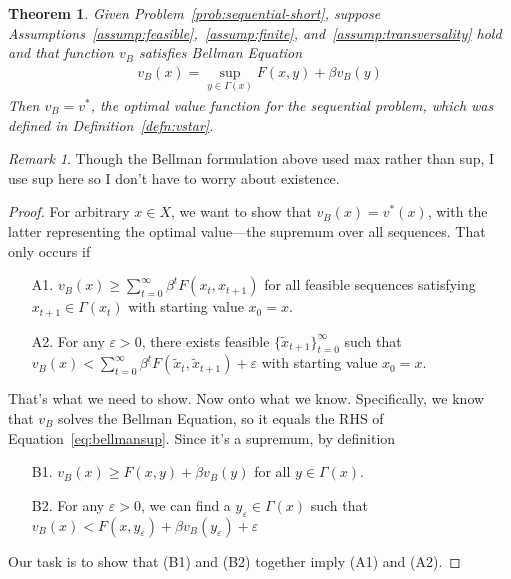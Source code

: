 \documentclass[12pt]{article}
\numberwithin{equation}{section} %
\theoremstyle{plain}
\newtheorem{thm}{Theorem}[section]
\theoremstyle{definition}
\theoremstyle{remark}
\newtheorem*{rmk}{Remark}
\newcommand{\sumtinfz}{\sum^\infty_{t=0}}
\begin{document}
\begin{thm}
Given Problem~\ref{prob:sequential-short}, suppose
Assumptions~\ref{assump:feasible},~\ref{assump:finite},
and~\ref{assump:transversality} hold and that function $v_B$ satisfies
Bellman Equation
\begin{align}
  \label{eq:bellmansup}
  v_B(x) = \sup_{y\in\Gamma(x)} F(x,y) + \beta v_B(y)
\end{align}
Then $v_B = v^*$, the optimal value function for the sequential problem,
which was defined in Definition~\ref{defn:vstar}.
\end{thm}
\begin{rmk}
Though the Bellman formulation above used max rather than sup, I use sup
here so I don't have to worry about existence.
\end{rmk}
\begin{proof}

For arbitrary $x\in X$, we want to show that $v_B(x)=v^*(x)$, with the
latter representing the optimal value---the supremum over all sequences.
That only occurs if
\begin{enumerate}
  \item[A1.] $v_B(x) \geq \sumtinfz \beta^t F(x_t,x_{t+1})$ for all
    feasible sequences satisfying $x_{t+1}\in\Gamma(x_t)$ with starting
    value $x_0=x$.
  \item[A2.] For any $\varepsilon>0$, there exists feasible
    $\{\tilde{x}_{t+1}\}_{t=0}^\infty$ such that
      $
      v_B(x) < \sumtinfz \beta^t
      F(\tilde{x}_{t}, \tilde{x}_{t+1}) + \varepsilon
      $
      with starting value $x_0=x$.
\end{enumerate}
That's what we need to show. Now onto what we know.  Specifically, we
know that $v_B$ solves the Bellman Equation, so it equals the RHS of
Equation~\ref{eq:bellmansup}. Since it's a supremum, by definition
\begin{enumerate}
  \item[B1.] $v_B(x) \geq F(x,y) + \beta v_B(y)$ for all $y\in\Gamma(x)$.
  \item[B2.] For any $\varepsilon>0$, we can find a
    $y_\varepsilon\in\Gamma(x)$ such that
    $
      v_B(x) < F(x,y_\varepsilon) + \beta v_B(y_\varepsilon) + \varepsilon
    $
\end{enumerate}
Our task is to show that (B1) and (B2) together imply (A1) and (A2).


\end{proof}
\end{document}
